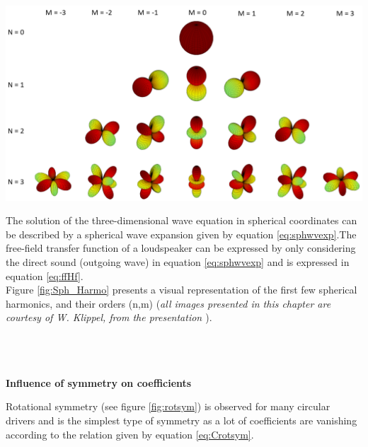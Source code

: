 \documentclass{report}
\begin{document}
\begin{appendices}
\begin{minipage}{0.5\textwidth}
\begin{center}
	\includegraphics[scale=0.25]{Appendix/Spherical_Harmo}
    \captionsetup{hypcap=false}
    \label{fig:Sph_Harmo}
\end{center}
\end{minipage}
\begin{minipage}{0.5\textwidth}
\vspace{0.2cm}
The solution of the three-dimensional wave equation in spherical coordinates can be described by a spherical wave expansion given by equation \ref{eq:sphwvexp}.The free-field transfer function of a loudspeaker can be expressed by only considering the direct sound (outgoing wave) in equation \ref{eq:sphwvexp} and is expressed in equation \ref{eq:ffHf}.\\

Figure \ref{fig:Sph_Harmo} presents a visual representation of the first few spherical harmonics, and their orders (n,m) (\textit{all images presented in this chapter are courtesy of W. Klippel, from the presentation \cite{lect2018}}). \\~\\~\\~\\
\end{minipage}


\textbf{Influence of symmetry on coefficients} \\

\begin{minipage}{0.7\textwidth}
Rotational symmetry (see figure \ref{fig:rotsym}) is observed for many circular drivers and is the simplest type of symmetry as a lot of coefficients are vanishing according to the relation given by equation \ref{eq:Crotsym}.


\end{minipage}
\end{appendices}
\end{document}

